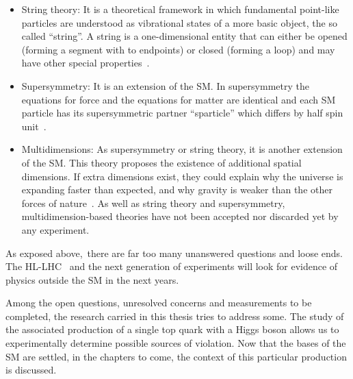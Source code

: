 \begin{itemize}
	\item String theory: 
		 It is a theoretical framework in which fundamental point-like particles are understood
		 as vibrational states of a more basic object, the so called ``string''. A string is a one-dimensional 
		 entity that can either be opened (forming a segment with to endpoints) or closed (forming a loop)
		 and may have other special properties~\cite{Veneziano:1968yb}. %
	\item Supersymmetry: It is an extension of the SM.
		In supersymmetry the equations for force and the equations for matter are identical and each 
		SM particle has its supersymmetric partner ``sparticle'' which
		differs by half spin unit~\cite{Nilles:1983ge}.  
	\item Multidimensions: As supersymmetry or string theory, it is another extension of the SM. This 
		theory proposes the existence of additional spatial dimensions. If extra dimensions exist, they could 
		explain why the universe is expanding faster than expected, and why gravity is weaker than the 
		other forces of nature~\cite{Arkani-Hamed:1998jmv}. As well as string theory and supersymmetry, 
		multidimension-based theories have not been accepted nor discarded yet by any experiment.
\end{itemize}


As exposed above, there are far too many 
unanswered questions and loose ends. The HL-LHC~\cite{ZurbanoFernandez:2020cco} and the 
next generation of experiments will look for evidence of physics outside the SM in the next years.

Among the open questions, unresolved concerns and measurements to be completed, the research 
carried in this thesis tries to address some. The study of the associated production of a single top quark with 
a Higgs boson allows us to experimentally determine possible sources of \CP violation. Now that the bases
of the SM are settled, in the chapters to come, the context of this particular production is discussed. 








